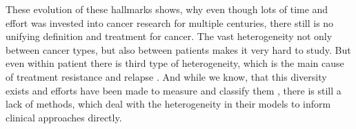 These evolution of these hallmarks shows, why even though lots of time and effort was invested into cancer research for multiple centuries, there still is no unifying definition and treatment for cancer. The vast heterogeneity not only between cancer types, but also between patients makes it very hard to study. But even within patient there is third type of heterogeneity, which is the main cause of treatment resistance and relapse \cite{DagogoJack2017}. And while we know, that this diversity exists and efforts have been made to measure and classify them \cite{Noorbakhsh2018}, there is still a lack of methods, which deal with the heterogeneity in their models to inform clinical approaches directly.

